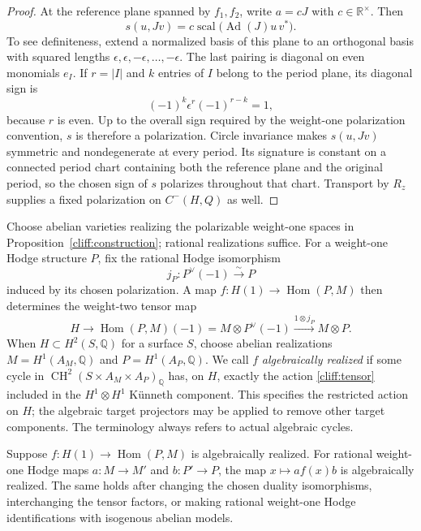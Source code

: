 \begin{proof}
At the reference plane spanned by $f_1,f_2$, write $a=cJ$ with
$c\in\mathbb R^\times$. Then
\[
 s(u,Jv)=c\operatorname{scal}\bigl(\operatorname{Ad}(J)u\,v^*\bigr).
\]
To see definiteness, extend a normalized basis of this plane to an
orthogonal basis with squared lengths
$\epsilon,\epsilon,-\epsilon,\ldots,-\epsilon$.
The last pairing is diagonal on even monomials $e_I$.
If $r=|I|$ and $k$ entries of $I$ belong to the period plane, its
diagonal sign is
\[
 (-1)^k\epsilon^r(-1)^{r-k}=1,
\]
because $r$ is even. Up to the overall sign required by the
weight-one polarization convention, $s$ is therefore a polarization.
Circle invariance makes $s(u,Jv)$ symmetric and nondegenerate at every
period. Its signature is constant on a connected period chart
containing both the reference plane and the original period, so the
chosen sign of $s$ polarizes throughout that chart.
Transport by $R_z$ supplies a fixed polarization
on $C^-(H,Q)$ as well.
\end{proof}

Choose abelian varieties realizing the polarizable weight-one spaces
in Proposition~\ref{cliff:construction}; rational realizations suffice.
For a weight-one Hodge structure $P$, fix the rational Hodge
isomorphism
\[
 j_P:P^\vee(-1)\xrightarrow{\sim}P
\]
induced by its chosen polarization. A map
$f:H(1)\to\operatorname{Hom}(P,M)$ then determines the weight-two
tensor map
\begin{equation}\label{cliff:tensor}
 H\longrightarrow\operatorname{Hom}(P,M)(-1)
   =M\otimes P^\vee(-1)
   \xrightarrow{1\otimes j_P}M\otimes P.
\end{equation}
When $H\subset H^2(S,\mathbb Q)$ for a surface $S$, choose abelian
realizations $M=H^1(A_M,\mathbb Q)$ and $P=H^1(A_P,\mathbb Q)$.
We call $f$ \emph{algebraically realized} if some cycle in
$\operatorname{CH}^2(S\times A_M\times A_P)_{\mathbb Q}$ has, on
$H$, exactly the action \eqref{cliff:tensor} included in the
$H^1\otimes H^1$ K\"unneth component. This specifies the restricted
action on $H$; the algebraic target projectors may be applied to
remove other target components. The terminology always refers to
actual algebraic cycles.

\begin{lemma}\label{cliff:slots}
Suppose $f:H(1)\to\operatorname{Hom}(P,M)$ is algebraically realized.
For rational weight-one Hodge maps
$a:M\to M'$ and $b:P'\to P$, the map
$x\mapsto a f(x)b$ is algebraically realized. The same holds after
changing the chosen duality isomorphisms, interchanging the tensor
factors, or making rational weight-one Hodge identifications with
isogenous abelian models.
\end{lemma}

